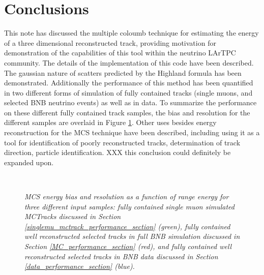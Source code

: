 \section{Conclusions}

This note has discussed the multiple coloumb technique for estimating the energy of a three dimensional reconstructed track, providing motivation for demonstration of the capabilities of this tool within the neutrino LArTPC community. The details of the implementation of this code have been described. The gaussian nature of scatters predicted by the Highland formula has been demonstrated. Additionally the performance of this method has been quantified in two different forms of simulation of fully contained tracks (single muons, and selected BNB neutrino events) as well as in {\ub} data. To summarize the performance on these different fully contained track samples, the bias and resolution for the different samples are overlaid in Figure \ref{MCS_range_bias_resolution_masteroverlay_fig}. Other uses besides energy reconstruction for the MCS technique have been described, including using it as a tool for identification of poorly reconstructed tracks, determination of track direction, particle identification.  XXX this conclusion could definitely be expanded upon.

\begin{figure}
\centering
\mbox{
	\quad
	}
\caption{\textit{MCS energy bias and resolution as a function of range energy for three different input samples: fully contained single muon simulated {\sc MCTracks} discussed in Section \ref{singlemu_mctrack_performance_section} (green), fully contained well reconstructed selected tracks in full BNB simulation discussed in Section \ref{MC_performance_section} (red), and fully contained well reconstructed selected tracks in BNB data discussed in Section \ref{data_performance_section} (blue).}}
\label{MCS_range_bias_resolution_masteroverlay_fig}
\end{figure}
